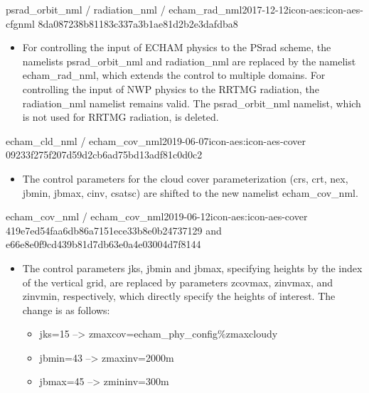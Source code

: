 \begin{changeitem}{psrad\_orbit\_nml / radiation\_nml / echam\_rad\_nml}{2017-12-12}{icon-aes:icon-aes-cfgnml 8da087238b81183c337a3b1ae81d2b2e3dafdba8}
  \begin{itemize}
   \item For controlling the input of ECHAM physics to the PSrad scheme, the namelists psrad\_orbit\_nml and radiation\_nml are replaced by the namelist echam\_rad\_nml, which extends the control to multiple domains. For controlling the input of NWP physics to the RRTMG radiation, the radiation\_nml namelist remains valid. The psrad\_orbit\_nml namelist, which is not used for RRTMG radiation, is deleted.
  \end{itemize}
\end{changeitem}

\begin{changeitem}{echam\_cld\_nml / echam\_cov\_nml}{2019-06-07}{icon-aes:icon-aes-cover 09233f275f207d59d2cb6ad75bd13adf81c0d0c2}
  \begin{itemize}
   \item The control parameters for the  cloud cover parameterization (crs, crt, nex, jbmin, jbmax, cinv, csatsc)  are shifted to the new namelist echam\_cov\_nml.
  \end{itemize}
\end{changeitem}

\begin{changeitem}{echam\_cov\_nml / echam\_cov\_nml}{2019-06-12}{icon-aes:icon-aes-cover 419e7ed54faa6db86a7151ece33b8e0b24737129 and e66e8e0f9cd439b81d7db63e0a4e03004d7f8144}
  \begin{itemize}
   \item The control parameters jks, jbmin and jbmax, specifying heights by the index of the vertical grid, are replaced by parameters zcovmax, zinvmax, and zinvmin, respectively, which directly specify the heights of interest. The change is as follows: \newline
   \begin{itemize}
    \item jks=15 --> zmaxcov=echam\_phy\_config\%zmaxcloudy
    \item jbmin=43 --> zmaxinv=2000m
    \item jbmax=45 --> zmininv=300m
   \end{itemize}
  \end{itemize}
\end{changeitem}

